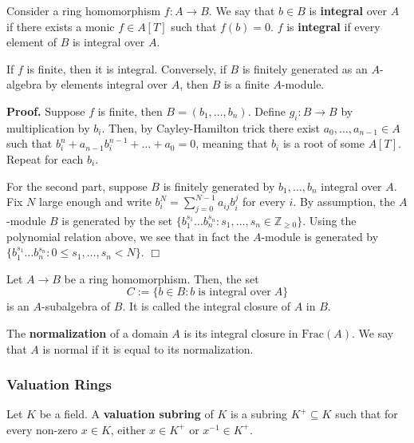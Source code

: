 \documentclass{template}
\newcommand{\qedwhite}{\hfill \ensuremath{\Box}}
\begin{document}
\begin{definition}
    Consider a ring homomorphism $f: A \to B$. We say that $b \in B$ is
    \textbf{integral} over $A$ if there exists a monic $f \in A[T]$ such that
    $f(b)=0$. $f$ is \textbf{integral} if every element of $B$ is integral over
    $A$.
\end{definition}

\begin{lemma}
    If $f$ is finite, then it is integral. Conversely, if $B$ is finitely 
    generated as an $A$-algebra by elements integral over $A$, then $B$
    is a finite $A$-module.
\end{lemma}

\textbf{Proof.} Suppose $f$ is finite, then $B=(b_1,\dots,b_n)$. Define $g_i: B
\to B$ by multiplication by $b_i$. Then, by Cayley-Hamilton trick there exist
$a_0,\dots,a_{n-1} \in A$ such that $b_i^n+a_{n-1}b_i^{n-1}+\dots+a_0=0$,
meaning that $b_i$ is a root of some $A[T]$. Repeat for each $b_i$.

For the second part, suppose $B$ is finitely generated by $b_1,\dots,b_n$
integral over $A$. Fix $N$ large enough and write $b_i^N =
\sum_{j=0}^{N-1}a_{ij}b_i^j$ for every $i$. By assumption, the $A$-module $B$ is
generated by the set $\{b_1^{s_1}\dots b_n^{s_n}: s_1,\dots,s_n \in
\mathbb{Z}_{\geq 0}\}$. Using the polynomial relation above, we see that in fact
the $A$-module is generated by $\{b_1^{s_1}\dots b_n^{s_n}: 0 \leq s_1,\dots,s_n
< N\}$. \qedwhite

\begin{definition}
    Let $A \to B$ be a ring homomorphism. Then, the set
    \begin{equation*}
        C := \{b \in B: b \; \text{is integral over} \; A\}
    \end{equation*}
    is an $A$-subalgebra of $B$. It is called the integral closure of $A$ in
    $B$.
\end{definition}

\begin{definition}
    The \textbf{normalization} of a domain $A$ is its integral closure in
    $\text{Frac}(A)$. We say that $A$ is normal if it is equal to its
    normalization.
\end{definition}

\subsubsection{Valuation Rings}

\begin{definition}
    Let $K$ be a field. A \textbf{valuation subring} of $K$ is a subring $K^+
    \subseteq K$ such that for every non-zero $x \in K$, either $x \in K^+$ or
    $x^{-1} \in K^+$.
\end{definition}
\end{document}
